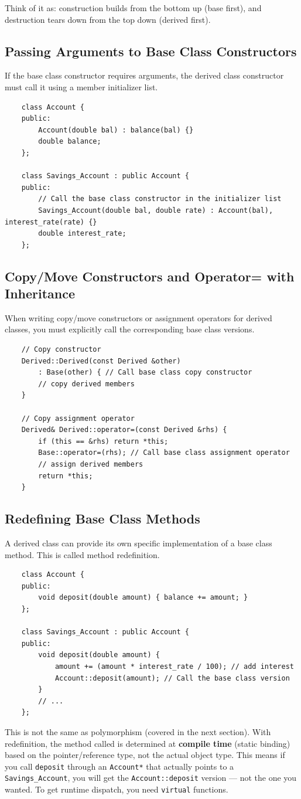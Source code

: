 Think of it as: construction builds from the bottom up (base first), and destruction tears down from the top down (derived first).

\subsection{Passing Arguments to Base Class Constructors}
If the base class constructor requires arguments, the derived class constructor must call it using a member initializer list.
\begin{lstlisting}
	class Account {
	public:
		Account(double bal) : balance(bal) {}
		double balance;
	};

	class Savings_Account : public Account {
	public:
		// Call the base class constructor in the initializer list
		Savings_Account(double bal, double rate) : Account(bal), interest_rate(rate) {}
		double interest_rate;
	};
\end{lstlisting}

\subsection{Copy/Move Constructors and Operator= with Inheritance}
When writing copy/move constructors or assignment operators for derived classes, you must explicitly call the corresponding base class versions.
\begin{lstlisting}
	// Copy constructor
	Derived::Derived(const Derived &other)
		: Base(other) { // Call base class copy constructor
		// copy derived members
	}

	// Copy assignment operator
	Derived& Derived::operator=(const Derived &rhs) {
		if (this == &rhs) return *this;
		Base::operator=(rhs); // Call base class assignment operator
		// assign derived members
		return *this;
	}
\end{lstlisting}

\subsection{Redefining Base Class Methods}
A derived class can provide its own specific implementation of a base class method. This is called method redefinition.
\begin{lstlisting}
	class Account {
	public:
		void deposit(double amount) { balance += amount; }
	};

	class Savings_Account : public Account {
	public:
		void deposit(double amount) {
			amount += (amount * interest_rate / 100); // add interest
			Account::deposit(amount); // Call the base class version
		}
		// ...
	};
\end{lstlisting}
\begin{remark}
	This is not the same as polymorphism (covered in the next section). With redefinition, the method called is determined at \textbf{compile time} (static binding) based on the pointer/reference type, not the actual object type. This means if you call \texttt{deposit} through an \texttt{Account*} that actually points to a \texttt{Savings\_Account}, you will get the \texttt{Account::deposit} version — not the one you wanted. To get runtime dispatch, you need \texttt{virtual} functions.
\end{remark}

